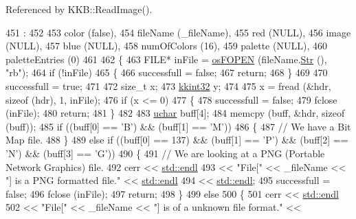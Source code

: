 Referenced by K\+K\+B\+::\+Read\+Image().


\begin{DoxyCode}
451                     :
452 
453   color          (\textcolor{keyword}{false}),
454   fileName       (\_fileName),
455   red            (NULL),
456   image          (NULL),
457   blue           (NULL),
458   numOfColors    (16),
459   palette        (NULL),
460   paletteEntries (0)
461 
462 \{
463   FILE*  inFile = \hyperlink{namespace_k_k_b_abf4050d2916ded8349dafadc80f0ecd1}{osFOPEN} (fileName.\hyperlink{class_k_k_b_1_1_k_k_str_ad574e6c0fe7f6ce1ba3ab0a8ce2fbd52}{Str} (), \textcolor{stringliteral}{"rb"});
464   \textcolor{keywordflow}{if}  (!inFile)
465   \{
466     successfull = \textcolor{keyword}{false};
467     \textcolor{keywordflow}{return};
468   \}
469 
470   successfull = \textcolor{keyword}{true};
471 
472   \textcolor{keywordtype}{size\_t}   x;
473   \hyperlink{namespace_k_k_b_a8fa4952cc84fda1de4bec1fbdd8d5b1b}{kkint32}  y;
474 
475   x = fread (&hdr, \textcolor{keyword}{sizeof} (hdr), 1, inFile);
476   \textcolor{keywordflow}{if}  (x <= 0)
477   \{
478     successfull = \textcolor{keyword}{false};
479     fclose (inFile);
480     \textcolor{keywordflow}{return};
481   \}
482 
483   \hyperlink{namespace_k_k_b_ace9969169bf514f9ee6185186949cdf7}{uchar}  buff[4];
484   memcpy (buff, &hdr, \textcolor{keyword}{sizeof} (buff));
485   \textcolor{keywordflow}{if}  ((buff[0] == \textcolor{charliteral}{'B'})  &&  (buff[1] == \textcolor{charliteral}{'M'}))
486   \{
487     \textcolor{comment}{// We have a Bit Map file.}
488   \}
489   \textcolor{keywordflow}{else} \textcolor{keywordflow}{if}  ((buff[0] == 137)  &&  (buff[1] == \textcolor{charliteral}{'P'})  &&  (buff[2] == \textcolor{charliteral}{'N'})  &&  (buff[3] == \textcolor{charliteral}{'G'}))
490   \{
491     \textcolor{comment}{// We are looking at a PNG (Portable Network Graphics) file.}
492     cerr << \hyperlink{namespace_k_k_b_ad1f50f65af6adc8fa9e6f62d007818a8}{std::endl} 
493          << \textcolor{stringliteral}{"File["} << \_fileName << \textcolor{stringliteral}{"]  is a PNG formatted file."} << \hyperlink{namespace_k_k_b_ad1f50f65af6adc8fa9e6f62d007818a8}{std::endl}
494          << \hyperlink{namespace_k_k_b_ad1f50f65af6adc8fa9e6f62d007818a8}{std::endl};
495     successfull = \textcolor{keyword}{false};
496     fclose (inFile);
497     \textcolor{keywordflow}{return};
498   \}
499   \textcolor{keywordflow}{else}
500   \{
501     cerr << \hyperlink{namespace_k_k_b_ad1f50f65af6adc8fa9e6f62d007818a8}{std::endl} 
502          << \textcolor{stringliteral}{"File["} << \_fileName << \textcolor{stringliteral}{"]  is of a unknown file format."} << 

\end{DoxyCode}
